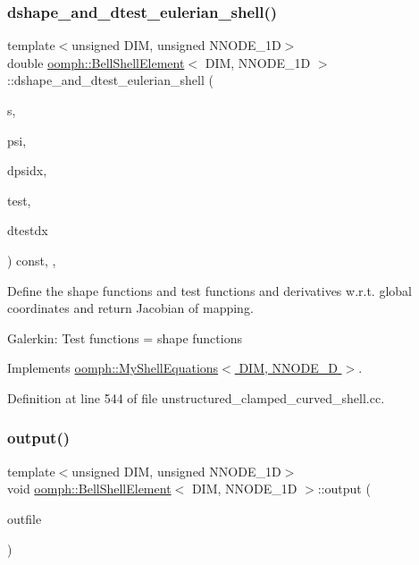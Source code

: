 \subsubsection{\texorpdfstring{dshape\+\_\+and\+\_\+dtest\+\_\+eulerian\+\_\+shell()}{dshape\_and\_dtest\_eulerian\_shell()}}
{\footnotesize\ttfamily template$<$unsigned D\+IM, unsigned N\+N\+O\+D\+E\+\_\+1D$>$ \\
double \hyperlink{classoomph_1_1BellShellElement}{oomph\+::\+Bell\+Shell\+Element}$<$ D\+IM, N\+N\+O\+D\+E\+\_\+1D $>$\+::dshape\+\_\+and\+\_\+dtest\+\_\+eulerian\+\_\+shell (\begin{DoxyParamCaption}\item[{const Vector$<$ double $>$ \&}]{s,  }\item[{Shape \&}]{psi,  }\item[{D\+Shape \&}]{dpsidx,  }\item[{Shape \&}]{test,  }\item[{D\+Shape \&}]{dtestdx }\end{DoxyParamCaption}) const\hspace{0.3cm}{\ttfamily [inline]}, {\ttfamily [protected]}, {\ttfamily [virtual]}}

Define the shape functions and test functions and derivatives w.\+r.\+t. global coordinates and return Jacobian of mapping.

Galerkin\+: Test functions = shape functions 

Implements \hyperlink{classoomph_1_1MyShellEquations_ac0cb5a90f9eceb2406c21c1e1dc662e7}{oomph\+::\+My\+Shell\+Equations$<$ D\+I\+M, N\+N\+O\+D\+E\+\_\+D $>$}.



Definition at line 544 of file unstructured\+\_\+clamped\+\_\+curved\+\_\+shell.\+cc.

\mbox{\label{classoomph_1_1BellShellElement_aebeebfbb5296217e3b6492392df3aeb5}} 
\subsubsection{\texorpdfstring{output()}{output()}\hspace{0.1cm}{\footnotesize\ttfamily [1/4]}}
{\footnotesize\ttfamily template$<$unsigned D\+IM, unsigned N\+N\+O\+D\+E\+\_\+1D$>$ \\
void \hyperlink{classoomph_1_1BellShellElement}{oomph\+::\+Bell\+Shell\+Element}$<$ D\+IM, N\+N\+O\+D\+E\+\_\+1D $>$\+::output (\begin{DoxyParamCaption}\item[{std\+::ostream \&}]{outfile }\end{DoxyParamCaption})\hspace{0.3cm}{\ttfamily [inline]}}



